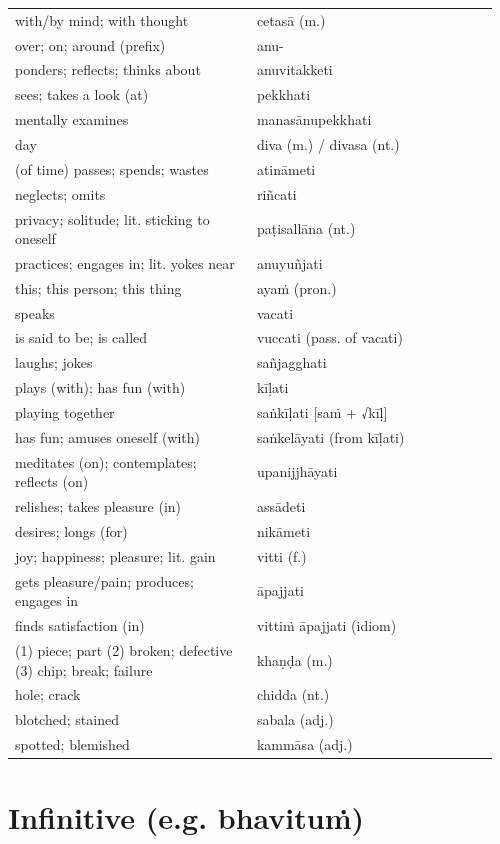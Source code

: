 \documentclass[11pt,oneside]{memoir}
\begin{document}
\bigskip

\begin{longtable}{L{0.48\linewidth} L{0.48\linewidth}}
with/by mind; with thought & cetasā (m.)\\
over; on; around (prefix) & anu-\\
ponders; reflects; thinks about & anuvitakketi\\
sees; takes a look (at) & pekkhati\\
mentally examines & manasānupekkhati\\
day & diva (m.) / divasa (nt.)\\
(of time) passes; spends; wastes & atināmeti\\
neglects; omits & riñcati\\
privacy; solitude; lit. sticking to oneself & paṭisallāna (nt.)\\
practices; engages in; lit. yokes near & anuyuñjati\\
this; this person; this thing & ayaṁ (pron.)\\
speaks & vacati\\
is said to be; is called & vuccati (pass. of vacati)\\
laughs; jokes & sañjagghati\\
plays (with); has fun (with) & kīḷati\\
playing together & saṅkīḷati [saṁ + √kīḷ]\\
has fun; amuses oneself (with) & saṅkelāyati (from kīḷati)\\
meditates (on); contemplates; reflects (on) & upanijjhāyati\\
relishes; takes pleasure (in) & assādeti\\
desires; longs (for) & nikāmeti\\
joy; happiness; pleasure; lit. gain & vitti (f.)\\
gets pleasure/pain; produces; engages in & āpajjati\\
finds satisfaction (in) & vittiṁ āpajjati (idiom)\\
(1) piece; part (2) broken; defective (3) chip; break; failure & khaṇḍa (m.)\\
hole; crack & chidda (nt.)\\
blotched; stained & sabala (adj.)\\
spotted; blemished & kammāsa (adj.)\\
\end{longtable}

\clearpage
\section{Infinitive (e.g. bhavituṁ)}
\label{sec:org63f26f9}
\end{document}
